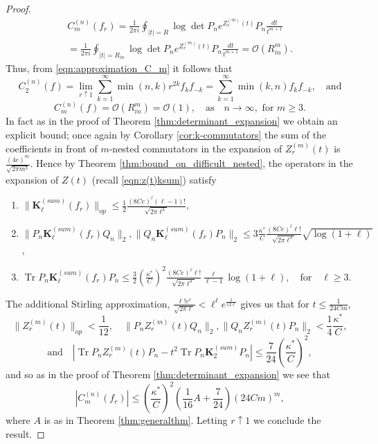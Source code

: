 \documentclass[10pt,a4paper]{amsart}
\DeclareMathOperator{\Tr}{Tr}
\begin{document}
\begin{proof}
\begin{multline}
C_{m}^{(n)}(f_r)
=\frac{1}{2\pi i}\oint_{|t|=R}\log \det P_n e^{Z_r^{(m)}(t)}P_n\frac{dt}{t^{m+1}}
\\
=\frac{1}{2\pi i}\oint_{|t|=R_{in}}\log \det P_n e^{Z_r^{(m)}(t)}P_n\frac{dt}{t^{m+1}}
%
=\mathcal{O}(R_{in}^{m}).
\end{multline}
Thus, from \eqref{eqn:approximation_C_m} it follows that 
$$C_2^{(n)}(f)=\lim_{r\uparrow 1} \sum_{k=1}^{\infty} \min(n, k) r^{2k} f_k f_{-k}=\sum_{k=1}^{\infty} \min(k,n) f_k f_{-k},\quad \text{and}$$
$$C_m^{(n)}(f)=\mathcal{O}(R_{in}^m)=\mathcal{O}(1),\quad\text{as}\quad n\rightarrow\infty, \text{ for } m\geq 3.$$
In fact as in the proof of Theorem \ref{thm:determinant_expansion} we obtain an explicit bound; once again by Corollary \ref{cor:k-commutators} the sum of the coefficients in front of $m$-nested commutators in the expansion of $Z_r^{(m)}(t)$ is $\frac{(4e)^m} 
{\sqrt{2\pi m^3}}$. 
Hence by Theorem \ref{thm:bound_on_difficult_nested}, the operators in the expansion of $Z(t)$ (recall \eqref{eqn:z(t)ksum}) satisfy
\begin{enumerate}
\item 
$
\|\mathbf{K}_{\ell}^{(sum)}(f_r)\|_{op}\leq 
%
\frac{1}{2}\frac{(8Ce)^{\ell}(\ell-1)!}{\sqrt{2\pi \ell^3}},
$
\item $\|P_n\mathbf{K}_{\ell}^{(sum)}(f_r)Q_n\|_{2}, \|Q_n\mathbf{K}_{\ell}^{(sum)}(f_r)P_n\|_{2}
\leq  
3\frac{\kappa^*}{C} \frac{(8Ce)^{\ell}\ell!}{\sqrt{2\pi \ell^3}} \sqrt{\log(1+\ell)}
$,
\item 
$
\Tr  P_n \mathbf{K}_{\ell}^{(sum)}(f_r) P_n 
\leq 
\frac{3}{2}
\left(\frac{\kappa^*}{C}\right)^{2} 
\frac{(8Ce)^{\ell} \ell!}{\sqrt{2\pi \ell^3}}
\frac{\ell}{\ell-1}\log(1+\ell),
\quad\text{for}\quad \ell\geq 3.
$
\end{enumerate}
The additional Stirling approximation, $\frac{\ell!e^{\ell}}{\sqrt{2\pi \ell}}< \ell^\ell e ^{\frac{1}{12\ell}}$ gives us that for $t\leq \frac{1}{24C m}$,
$$\|Z_r^{(m)}(t)\|_{op}< \frac{1}{12},\quad \|P_nZ_r^{(m)}(t)Q_n\|_2, \|Q_nZ_r^{(m)}(t)P_n\|_2< \frac{1}{4}\frac{\kappa^*}{C},$$
$$\text{and}\quad\left|\Tr  P_nZ_r^{(m)}(t)P_n
- t^2\Tr  P_n\mathbf{K}_2^{(sum)}P_n\right|
\leq
\frac{7}{24}\left(\frac{\kappa^*}{C}\right)^2,
$$
and so as in the proof of Theorem \ref{thm:determinant_expansion}
we see that 
$$|C_m^{(n)}(f_r)|\leq \left(\frac{\kappa^*}{C}\right)^2 \left(\frac{1}{16}A +\frac{7}{24}
\right)\left(24Cm\right)^{m},$$
where $A$ is as in Theorem \ref{thm:generalthm}. Letting $r\uparrow 1$ we conclude the result.
\end{proof}
\end{document}
